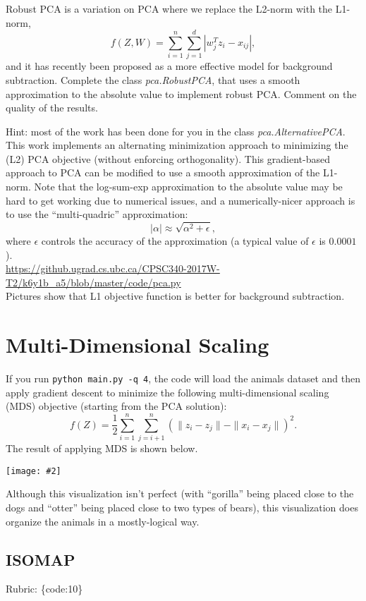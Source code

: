 \documentclass{article}
\def\rubric#1{\gre{Rubric: \{#1\}}}{}
\def\blu#1{{\color{blu}#1}}
\def\gre#1{{\color{gre}#1}}
\def\norm#1{\|#1\|}
\newcommand{\centerfig}[2]{\begin{center}\texttt{[image: \#2]}\end{center}}
\begin{document}
Robust PCA is a variation on PCA where we replace the L2-norm with the L1-norm,
\[
f(Z,W) = \sum_{i=1}^n\sum_{j=1}^d |w_j^Tz_i - x_{ij}|,
\]
and it has recently been proposed as a more effective model for background subtraction. \blu{Complete the class \emph{pca.RobustPCA},
that uses a smooth approximation to the absolute value to implement robust PCA. Comment on the quality of the results.}

Hint: most of the work has been done for you in the class \emph{pca.AlternativePCA}.
This work implements an alternating minimization approach to minimizing the (L2) PCA objective (without enforcing orthogonality). This gradient-based approach to PCA can be modified to use a smooth approximation of the L1-norm. Note that the log-sum-exp approximation to the absolute value may be hard to get working due to numerical issues, and a numerically-nicer approach is to use the ``multi-quadric'' approximation:
\[
|\alpha| \approx \sqrt{\alpha^2 + \epsilon},
\]
where $\epsilon$ controls the accuracy of the approximation (a typical value of $\epsilon$ is $0.0001$).
\\
\gre{\url{https://github.ugrad.cs.ubc.ca/CPSC340-2017W-T2/k6y1b_a5/blob/master/code/pca.py}}\\
\gre{Pictures show that L1 objective function is better for background subtraction. }

\section{Multi-Dimensional Scaling}

If you run \verb|python main.py -q 4|, the code will load the animals dataset and then apply gradient descent to minimize the following multi-dimensional scaling (MDS) objective (starting from the PCA solution):
\begin{equation}
\label{eq:MDS}
f(Z) =  \frac{1}{2}\sum_{i=1}^n\sum_{j=i+1}^n (  \norm{z_i - z_j} - \norm{x_i - x_j})^2.
\end{equation}
 The result of applying MDS is shown below.
\centerfig{.5}{../figs/MDS_animals.png}
Although this visualization isn't perfect (with ``gorilla'' being placed close to the dogs and ``otter'' being placed close to two types of bears), this visualization does organize the animals in a mostly-logical way.


\subsection{ISOMAP}
\rubric{code:10}
\end{document}
